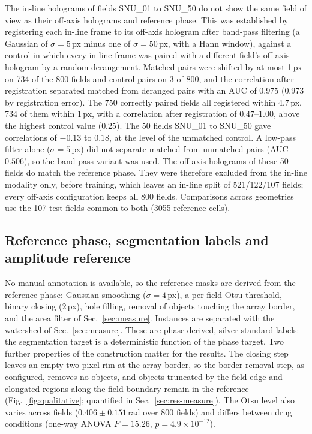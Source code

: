 \documentclass[11pt]{article}
\begin{document}
The in-line holograms of fields SNU\_01 to SNU\_50 do not show the same field
of view as their off-axis holograms and reference phase. This was established
by registering each in-line frame to its off-axis hologram after band-pass
filtering (a Gaussian of $\sigma=5$\,px minus one of $\sigma=50$\,px, with a
Hann window), against a control in which every in-line frame was paired with a
different field's off-axis hologram by a random derangement. Matched pairs
were shifted by at most 1\,px on 734 of the 800 fields and control pairs on 3
of 800, and the correlation after registration separated matched from deranged
pairs with an AUC of $0.975$ ($0.973$ by registration error). The 750 correctly
paired fields all registered within 4.7\,px, 734 of them within 1\,px, with a
correlation after registration of $0.47$--$1.00$, above the highest control
value ($0.25$). The 50 fields SNU\_01 to SNU\_50 gave correlations of $-0.13$
to $0.18$, at the level of the unmatched control. A low-pass filter alone
($\sigma=5$\,px) did not separate matched from unmatched pairs (AUC $0.506$),
so the band-pass variant was used.
The off-axis holograms of these 50 fields do match the reference phase. They
were therefore excluded from the in-line modality only, before training, which
leaves an in-line split of 521/122/107 fields; every off-axis configuration
keeps all 800 fields. Comparisons across geometries use the 107 test fields
common to both (3055 reference cells).



\subsection{Reference phase, segmentation labels and amplitude reference}
\label{sec:labels}

No manual annotation is available, so the reference masks are derived from the
reference phase: Gaussian smoothing ($\sigma=4$\,px), a per-field Otsu
threshold, binary closing (2\,px), hole filling, removal of objects touching the
array border, and the area filter of Sec.~\ref{sec:measure}. Instances are
separated with the watershed of Sec.~\ref{sec:measure}. These are
phase-derived, silver-standard labels: the segmentation target is a
deterministic function of the phase target. Two further properties of the
construction matter for the results. The closing step leaves an empty
two-pixel rim at the array border, so the border-removal step, as configured,
removes no objects, and objects truncated by the field edge and elongated
regions along the field boundary remain in the reference
(Fig.~\ref{fig:qualitative}; quantified in Sec.~\ref{sec:res-measure}). The
Otsu level also varies across fields ($0.406 \pm 0.151$\,rad over 800 fields)
and differs between drug conditions (one-way ANOVA $F=15.26$,
$p=4.9\times10^{-12}$).
\end{document}

